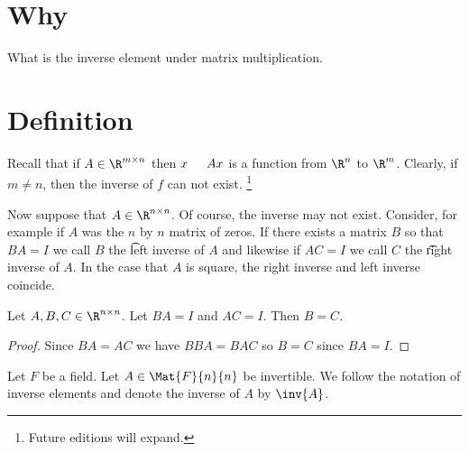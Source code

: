
\section*{Why}

What is the inverse element under matrix multiplication.

\section*{Definition}

Recall that if $A \in \R ^{m \times n}$ then $x \indent Ax$ is a function from $\R ^{n}$ to $\R ^{m}$.
Clearly, if $m \neq n$, then the inverse of $f$ can not exist.
  \ifhmode\unskip\fi\footnote{
Future editions will expand.
  }

Now suppose that $A \in \R ^{n \times n}$.
Of course, the inverse may not exist.
Consider, for example if $A$ was the $n$ by $n$ matrix of zeros.
If there exists a matrix $B$ so that $BA = I$ we call $B$ the \t{left inverse} of $A$ and likewise if $AC = I$ we call $C$ the \t{right inverse} of $A$.
In the case that $A$ is square, the right inverse and left inverse coincide.

\begin{proposition}
Let $A, B, C \in \R ^{n \times n}$.
Let $BA = I$ and $AC = I$.
Then $B = C$.
\begin{proof}
Since $BA = AC$ we have $BBA = BAC$ so $B = C$ since $BA = I$.
\end{proof}
\end{proposition}


Let $F$ be a field.
Let $A \in \Mat{F}{n}{n}$
be invertible.
We follow the notation of
inverse elements and denote
the inverse of $A$ by
$\inv{A}$.

\blankpage